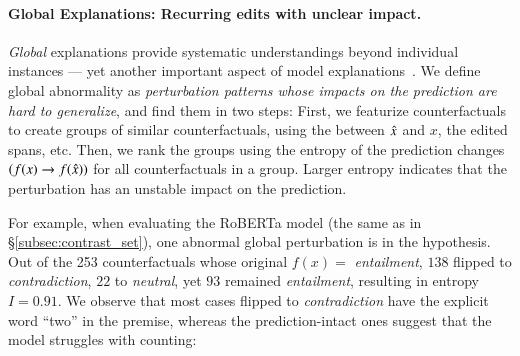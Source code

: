 \paragraph{Global Explanations: Recurring edits with unclear impact.}
\label{subsec:global_exp}
\emph{Global} explanations provide systematic understandings beyond individual instances --- yet another important aspect of model explanations~\cite{miller}.
We define global abnormality as \emph{perturbation patterns whose impacts on the prediction are hard to generalize}, and find them in two steps:
First, we featurize counterfactuals to create groups of similar counterfactuals, using the \tagstr between $\hat{x}$ and $x$, the edited spans, etc.
Then, we rank the groups using the entropy of the prediction changes $(f(x) \rightarrow f(\hat{x}))$ for all counterfactuals in a group.
Larger entropy indicates that the perturbation has an unstable impact on the prediction.

For example, when evaluating the \nli RoBERTa model (the same as in \S\ref{subsec:contrast_set}), one abnormal global perturbation is  in the hypothesis.
Out of the 253 counterfactuals whose original $f(x)=$ \emph{entailment}, $138$ flipped to \emph{contradiction}, $22$ to \emph{neutral}, yet $93$ remained \emph{entailment}, resulting in entropy $I=0.91$.
We observe that most cases flipped to \emph{contradiction} have the explicit word ``two'' in the premise, whereas the prediction-intact ones suggest that the model struggles with counting:


